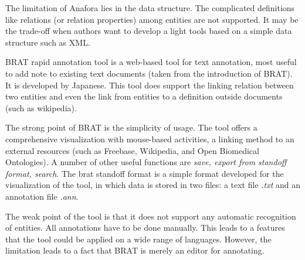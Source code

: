 The limitation of Anafora lies in the data structure. The complicated deﬁnitions like relations (or relation properties) 
among entities are not supported. It may be the trade-off when authors want to develop a light tools based on a simple
data structure such as XML.


BRAT rapid annotation tool is a web-based tool for text annotation, most useful to add note to existing text documents 
(taken from the introduction of BRAT). It is developed by Japanese. This tool does support the linking relation between 
two entities and even the link 
from entities to a definition outside documents (such as wikipedia).

The strong point of BRAT is the simplicity of usage. The tool offers a comprehensive visualization with mouse-based 
activities, a linking method to an external resources (such as Freebase, Wikipedia, and Open Biomedical Ontologies). A number 
of other useful functions are \textit{save, export from standoff format, search}. The brat standoff format is a simple 
format developed for the visualization of the tool, in which data is stored in two files: a text file \textit{.txt} and an
annotation file \textit{.ann}.

The weak point of the tool is that it does not support any automatic recognition of entities. All annotations have to be
done manually. This leads to a features that the tool could be applied on a wide range of languages. However, the 
limitation leads to a fact that BRAT is merely an editor for annotating.

